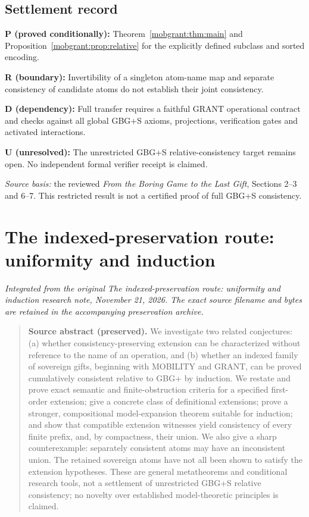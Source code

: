 \documentclass[11pt,letterpaper]{article}
\theoremstyle{definition}\newtheorem{definition}[theorem]{Definition}\newtheorem{example}[theorem]{Example}
\theoremstyle{remark}\newtheorem{remark}[theorem]{Remark}
\begin{document}
\subsection{Settlement record}
\textbf{P (proved conditionally):} Theorem~\ref{mobgrant:thm:main} and Proposition~\ref{mobgrant:prop:relative} for the explicitly defined subclass and sorted encoding.\par
\textbf{R (boundary):} Invertibility of a singleton atom-name map and separate consistency of candidate atoms do not establish their joint consistency.\par
\textbf{D (dependency):} Full transfer requires a faithful GRANT operational contract and checks against all global GBG+S axioms, projections, verification gates and activated interactions.\par
\textbf{U (unresolved):} The unrestricted GBG+S relative-consistency target remains open. No independent formal verifier receipt is claimed.

\small\emph{Source basis:} the reviewed \emph{From the Boring Game to the Last Gift}, Sections 2--3 and 6--7. This restricted result is not a certified proof of full GBG+S consistency.



\section{The indexed-preservation route: uniformity and induction}\label{br:sec:induct}
\noindent\textit{Integrated from the original The indexed-preservation route: uniformity and induction research note, November 21, 2026. The exact source filename and bytes are retained in the accompanying preservation archive.}

\begin{quote}\small\textbf{Source abstract (preserved).} We investigate two related conjectures: (a) whether consistency-preserving extension can be characterized without reference to the name of an operation, and (b) whether an indexed family of sovereign gifts, beginning with MOBILITY and GRANT, can be proved cumulatively consistent relative to GBG+ by induction. We restate and prove exact semantic and finite-obstruction criteria for a specified first-order extension; give a concrete class of definitional extensions; prove a stronger, compositional model-expansion theorem suitable for induction; and show that compatible extension witnesses yield consistency of every finite prefix, and, by compactness, their union. We also give a sharp counterexample: separately consistent atoms may have an inconsistent union. The retained sovereign atoms have not all been shown to satisfy the extension hypotheses. These are general metatheorems and conditional research tools, not a settlement of unrestricted GBG+S relative consistency; no novelty over established model-theoretic principles is claimed.\end{quote}
\end{document}
